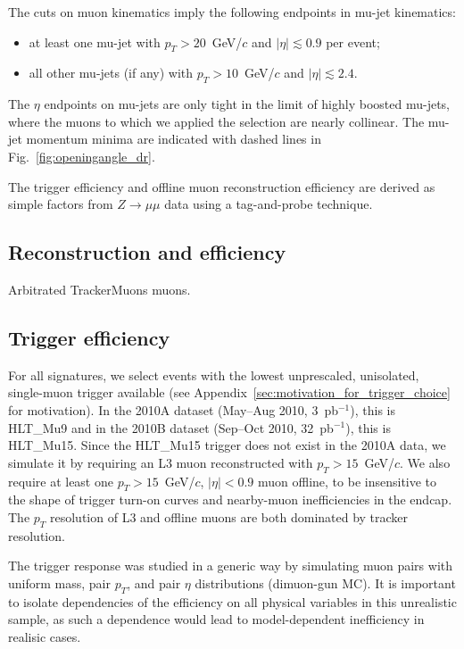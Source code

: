 \documentclass[12pt]{cms-tdr}
\begin{document}

The cuts on muon kinematics imply the following endpoints in mu-jet kinematics:
\begin{itemize}
\item at least one mu-jet with $p_T > 20$~GeV/$c$ and $|\eta| \lesssim 0.9$ per event;
\item all other mu-jets (if any) with $p_T > 10$~GeV/$c$ and $|\eta| \lesssim 2.4$.
\end{itemize}
The $\eta$ endpoints on mu-jets are only tight in the limit of highly
boosted mu-jets, where the muons to which we applied the selection are
nearly collinear.  The mu-jet momentum minima are indicated with
dashed lines in Fig.~\ref{fig:openingangle_dr}.

The trigger efficiency and offline muon reconstruction efficiency are
derived as simple factors from $Z \to \mu\mu$ data using a
tag-and-probe technique.

\subsection{Reconstruction and efficiency}

Arbitrated TrackerMuons muons.

\subsection{Trigger efficiency}

For all signatures, we select events with the lowest unprescaled,
unisolated, single-muon trigger available (see
Appendix~\ref{sec:motivation_for_trigger_choice} for motivation).  In
the 2010A dataset (May--Aug 2010, 3~pb$^{-1}$), this is HLT\_Mu9 and
in the 2010B dataset (Sep--Oct 2010, 32~pb$^{-1}$), this is HLT\_Mu15.
Since the HLT\_Mu15 trigger does not exist in the 2010A data, we
simulate it by requiring an L3 muon reconstructed with $p_T >
15$~GeV/$c$.  We also require at least one $p_T > 15$~GeV/$c$, $|\eta|
< 0.9$ muon offline, to be insensitive to the shape of trigger turn-on
curves and nearby-muon inefficiencies in the endcap.  The $p_T$
resolution of L3 and offline muons are both dominated by tracker
resolution.

The trigger response was studied in a generic way by simulating muon
pairs with uniform mass, pair $p_T$, and pair $\eta$ distributions
(dimuon-gun MC).  It is important to isolate dependencies of the
efficiency on all physical variables in this unrealistic sample, as
such a dependence would lead to model-dependent inefficiency in
realisic cases.
\end{document}
